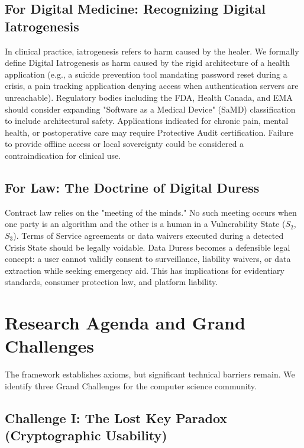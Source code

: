 \documentclass[acmsmall,review]{acmart}
\begin{document}
\subsection{For Digital Medicine: Recognizing Digital Iatrogenesis}

In clinical practice, iatrogenesis refers to harm caused by the healer. We formally define Digital Iatrogenesis as harm caused by the rigid architecture of a health application (e.g., a suicide prevention tool mandating password reset during a crisis, a pain tracking application denying access when authentication servers are unreachable). Regulatory bodies including the FDA, Health Canada, and EMA should consider expanding "Software as a Medical Device" (SaMD) classification to include architectural safety. Applications indicated for chronic pain, mental health, or postoperative care may require Protective Audit certification. Failure to provide offline access or local sovereignty could be considered a contraindication for clinical use.

\subsection{For Law: The Doctrine of Digital Duress}

Contract law relies on the "meeting of the minds." No such meeting occurs when one party is an algorithm and the other is a human in a Vulnerability State ($S_2$, $S_3$). Terms of Service agreements or data waivers executed during a detected Crisis State should be legally voidable. Data Duress becomes a defensible legal concept: a user cannot validly consent to surveillance, liability waivers, or data extraction while seeking emergency aid. This has implications for evidentiary standards, consumer protection law, and platform liability.

\section{Research Agenda and Grand Challenges}

The framework establishes axioms, but significant technical barriers remain. We identify three Grand Challenges for the computer science community.

\subsection{Challenge I: The Lost Key Paradox (Cryptographic Usability)}
\end{document}
